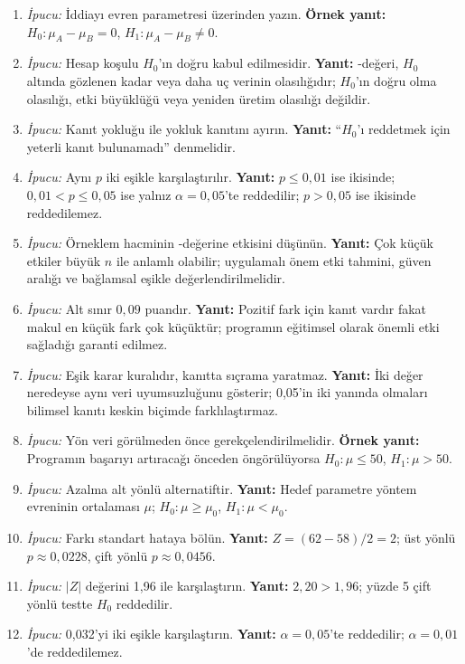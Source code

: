 \begin{enumerate}[leftmargin=*,itemsep=5pt]
\item \emph{İpucu:} İddiayı evren parametresi üzerinden yazın.
\textbf{Örnek yanıt:} $H_0:\mu_A-\mu_B=0$, $H_1:\mu_A-\mu_B\ne0$.
\item \emph{İpucu:} Hesap koşulu $H_0$'ın doğru kabul edilmesidir.
\textbf{Yanıt:} \pval-değeri, $H_0$ altında gözlenen kadar veya daha uç verinin
olasılığıdır; $H_0$'ın doğru olma olasılığı, etki büyüklüğü veya yeniden üretim
olasılığı değildir.
\item \emph{İpucu:} Kanıt yokluğu ile yokluk kanıtını ayırın.
\textbf{Yanıt:} ``$H_0$'ı reddetmek için yeterli kanıt bulunamadı'' denmelidir.
\item \emph{İpucu:} Aynı $p$ iki eşikle karşılaştırılır.
\textbf{Yanıt:} $p\le0{,}01$ ise ikisinde; $0{,}01<p\le0{,}05$ ise yalnız
$\alpha=0{,}05$'te reddedilir; $p>0{,}05$ ise ikisinde reddedilemez.
\item \emph{İpucu:} Örneklem hacminin \pval-değerine etkisini düşünün.
\textbf{Yanıt:} Çok küçük etkiler büyük $n$ ile anlamlı olabilir; uygulamalı
önem etki tahmini, güven aralığı ve bağlamsal eşikle değerlendirilmelidir.
\item \emph{İpucu:} Alt sınır $0{,}09$ puandır.
\textbf{Yanıt:} Pozitif fark için kanıt vardır fakat makul en küçük fark çok
küçüktür; programın eğitimsel olarak önemli etki sağladığı garanti edilmez.
\item \emph{İpucu:} Eşik karar kuralıdır, kanıtta sıçrama yaratmaz.
\textbf{Yanıt:} İki değer neredeyse aynı veri uyumsuzluğunu gösterir; 0,05'in
iki yanında olmaları bilimsel kanıtı keskin biçimde farklılaştırmaz.
\item \emph{İpucu:} Yön veri görülmeden önce gerekçelendirilmelidir.
\textbf{Örnek yanıt:} Programın başarıyı artıracağı önceden öngörülüyorsa
$H_0:\mu\le50$, $H_1:\mu>50$.
\item \emph{İpucu:} Azalma alt yönlü alternatiftir.
\textbf{Yanıt:} Hedef parametre yöntem evreninin ortalaması $\mu$;
$H_0:\mu\ge\mu_0$, $H_1:\mu<\mu_0$.
\item \emph{İpucu:} Farkı standart hataya bölün.
\textbf{Yanıt:} $Z=(62-58)/2=2$; üst yönlü $p\approx0{,}0228$, çift yönlü
$p\approx0{,}0456$.
\item \emph{İpucu:} $|Z|$ değerini 1,96 ile karşılaştırın.
\textbf{Yanıt:} $2{,}20>1{,}96$; yüzde 5 çift yönlü testte $H_0$ reddedilir.
\item \emph{İpucu:} 0,032'yi iki eşikle karşılaştırın.
\textbf{Yanıt:} $\alpha=0{,}05$'te reddedilir; $\alpha=0{,}01$'de reddedilemez.

\end{enumerate}

